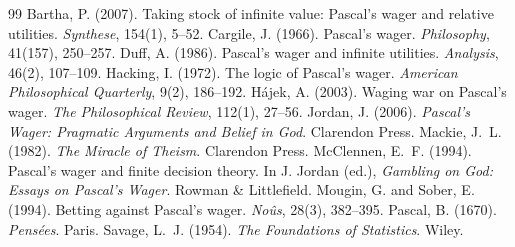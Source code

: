\documentclass{situationist-preprint}
\begin{document}
\begin{thebibliography}{99}\small
{} Bartha, P. (2007). Taking stock of infinite value: Pascal's wager and relative utilities. \emph{Synthese}, 154(1), 5--52.
 Cargile, J. (1966). Pascal's wager. \emph{Philosophy}, 41(157), 250--257.
 Duff, A. (1986). Pascal's wager and infinite utilities. \emph{Analysis}, 46(2), 107--109.
 Hacking, I. (1972). The logic of Pascal's wager. \emph{American Philosophical Quarterly}, 9(2), 186--192.
 H\'ajek, A. (2003). Waging war on Pascal's wager. \emph{The Philosophical Review}, 112(1), 27--56.
 Jordan, J. (2006). \emph{Pascal's Wager: Pragmatic Arguments and Belief in God}. Clarendon Press.
 Mackie, J.~L. (1982). \emph{The Miracle of Theism}. Clarendon Press.
 McClennen, E.~F. (1994). Pascal's wager and finite decision theory. In J. Jordan (ed.), \emph{Gambling on God: Essays on Pascal's Wager}. Rowman \& Littlefield.
 Mougin, G. and Sober, E. (1994). Betting against Pascal's wager. \emph{No\^us}, 28(3), 382--395.
 Pascal, B. (1670). \emph{Pens\'ees}. Paris.
 Savage, L.~J. (1954). \emph{The Foundations of Statistics}. Wiley.
\end{thebibliography}
\end{document}
